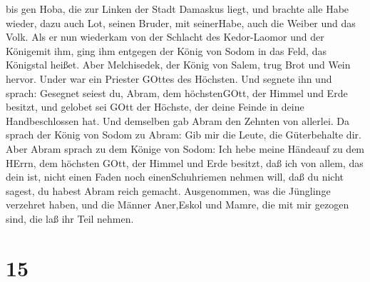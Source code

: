 bis gen Hoba, die zur Linken der Stadt Damaskus liegt,  und
brachte alle Habe wieder, dazu auch Lot, seinen Bruder, mit seinerHabe,
auch die Weiber und das Volk.  Als er nun wiederkam von der
Schlacht des Kedor-Laomor und der Königemit ihm, ging ihm entgegen der
König von Sodom in das Feld, das Königstal heißet.  Aber
Melchisedek, der König von Salem, trug Brot und Wein hervor. Under war
ein Priester GOttes des Höchsten.  Und segnete ihn und
sprach: Gesegnet seiest du, Abram, dem höchstenGOtt, der Himmel und Erde
besitzt,  und gelobet sei GOtt der Höchste, der deine
Feinde in deine Handbeschlossen hat. Und demselben gab Abram den Zehnten
von allerlei.  Da sprach der König von Sodom zu Abram: Gib
mir die Leute, die Güterbehalte dir.  Aber Abram sprach zu
dem Könige von Sodom: Ich hebe meine Händeauf zu dem HErrn, dem höchsten
GOtt, der Himmel und Erde besitzt,  daß ich von allem, das
dein ist, nicht einen Faden noch einenSchuhriemen nehmen will, daß du
nicht sagest, du habest Abram reich gemacht.  Ausgenommen,
was die Jünglinge verzehret haben, und die Männer Aner,Eskol und Mamre,
die mit mir gezogen sind, die laß ihr Teil nehmen.

\hypertarget{section-14}{%
\section{15}\label{section-14}}

